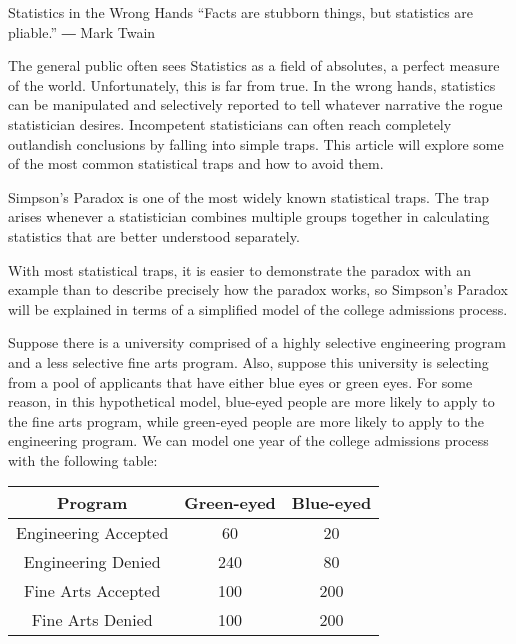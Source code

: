 
Statistics in the Wrong Hands
“Facts are stubborn things, but statistics are pliable.”
― Mark Twain

The general public often sees Statistics as a field of absolutes, a perfect measure of the world. Unfortunately, this is far from true. In the wrong hands, statistics can be manipulated and selectively reported to tell whatever narrative the rogue statistician desires. Incompetent statisticians can often reach completely outlandish conclusions by falling into simple traps. This article will explore some of the most common statistical traps and how to avoid them.

Simpson’s Paradox is one of the most widely known statistical traps. The trap arises whenever a statistician combines multiple groups together in calculating statistics that are better understood separately.

With most statistical traps, it is easier to demonstrate the paradox with an example than to describe precisely how the paradox works, so Simpson’s Paradox will be explained in terms of a simplified model of the college admissions process.

Suppose there is a university comprised of a highly selective engineering program and a less selective fine arts program. Also, suppose this university is selecting from a pool of applicants that have either blue eyes or green eyes. For some reason, in this hypothetical model, blue-eyed people are more likely to apply to the fine arts program, while green-eyed people are more likely to apply to the engineering program. We can model one year of the college admissions process with the following table:

\begin{center}
\begin{tabular}{c c c}
\toprule
Program & Green-eyed & Blue-eyed \\
\midrule
Engineering Accepted & 60 & 20 \\
Engineering Denied & 240 & 80 \\
Fine Arts Accepted & 100 & 200 \\
Fine Arts Denied & 100 & 200 \\
\bottomrule
\end{tabular}
\end{center}

